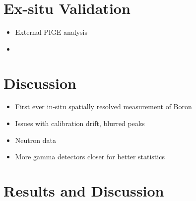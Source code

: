\documentclass[11pt,a4paper,twocolumn]{article}
\begin{document}
\section{Ex-situ Validation}
\begin{itemize}
	\item External PIGE analysis
	\item 
\end{itemize}
\section{Discussion}
\begin{itemize}
	\item First ever in-situ spatially resolved measurement of Boron
	\item Issues with calibration drift, blurred peaks
	\item Neutron data
	\item More gamma detectors closer for better statistics
\end{itemize}

\section{Results and Discussion}





\end{document}
